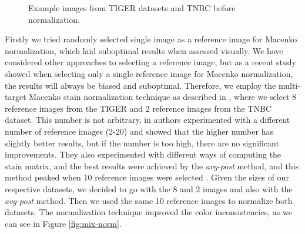 \begin{figure}[H]
  \caption{Example images from TIGER datasets \cite{tiger_dataset} and TNBC \cite{TNBC-nuclei-seg-extended} before normalization.}
  \label{fig:mix-no-norm}
\end{figure}

Firstly we tried randomly selected single image as a reference image for Macenko normalization, which laid suboptimal results when assessed visually. We have considered other approaches to selecting a reference image, but as a recent study \cite{Ivanov2024} showed when selecting only a single reference image for Macenko normalization, the results will always be biased and suboptimal. Therefore, we employ the multi-target Macenko stain normalization technique as described in \cite{Ivanov2024}, where we select 8 reference images from the TIGER and 2 reference images from the TNBC dataset. This number is not arbitrary, in \cite{Ivanov2024} authors experimented with a different number of reference images (2-20) and showed that the higher number has slightly better results, but if the number is too high, there are no significant improvements. They also experimented with different ways of computing the stain matrix, and the best results were achieved by the \textit{avg-post} method, and this method peaked when 10 reference images were selected \cite{Ivanov2024}. Given the sizes of our respective datasets, we decided to go with the 8 and 2 images and also with the \textit{avg-post} method. Then we used the same 10 reference images to normalize both datasets. The normalization technique improved the color inconsistencies, as we can see in Figure \ref{fig:mix-norm}.

